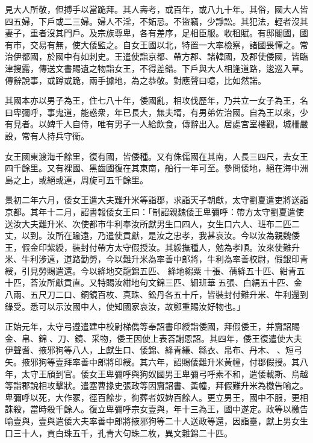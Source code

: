 \begin{pinyinscope}
 
 見大人所敬，但搏手以當跪拜。其人壽考，或百年，或八九十年。其俗，國大人皆四五婦，下戶或二三婦。婦人不淫，不妬忌。不盜竊，少諍訟。其犯法，輕者沒其妻子，重者沒其門戶。及宗族尊卑，各有差序，足相臣服。收租賦。有邸閣國，國有市，交易有無，使大倭監之。自女王國以北，特置一大率檢察，諸國畏憚之。常治伊都國，於國中有如刺史。王遣使詣京都、帶方郡、諸韓國，及郡使倭國，皆臨津搜露，傳送文書賜遺之物詣女王，不得差錯。下戶與大人相逢道路，逡巡入草。傳辭說事，或蹲或跪，兩手據地，為之恭敬。對應聲曰噫，比如然諾。
 
 
 
 
 其國本亦以男子為王，住七八十年，倭國亂，相攻伐歷年，乃共立一女子為王，名曰卑彌呼，事鬼道，能惑衆，年已長大，無夫壻，有男弟佐治國。自為王以來，少有見者。以婢千人自侍，唯有男子一人給飲食，傳辭出入。居處宮室樓觀，城柵嚴設，常有人持兵守衞。
 
 
 
 
 女王國東渡海千餘里，復有國，皆倭種。又有侏儒國在其南，人長三四尺，去女王四千餘里。又有裸國、黑齒國復在其東南，船行一年可至。參問倭地，絕在海中洲島之上，或絕或連，周旋可五千餘里。
 
 
景初二年六月，倭女王遣大夫難升米等詣郡，求詣天子朝獻，太守劉夏遣吏將送詣京都。其年十二月，詔書報倭女王曰：「制詔親魏倭王卑彌呼：帶方太守劉夏遣使送汝大夫難升米、次使都巿牛利奉汝所獻男生口四人，女生口六人、班布二匹二丈，以到。汝所在踰遠，乃遣使貢獻，是汝之忠孝，我甚哀汝。今以汝為親魏倭王，假金印紫綬，裝封付帶方太守假授汝。其綏撫種人，勉為孝順。汝來使難升米、牛利涉遠，道路勤勞，今以難升米為率善中郎將，牛利為率善校尉，假銀印青綬，引見勞賜遣還。今以絳地交龍錦五匹、
 絳地縐粟𦋺十張、蒨絳五十匹、紺青五十匹，荅汝所獻貢直。又特賜汝紺地句文錦三匹、細班華𦋺五張、白絹五十匹、金八兩、五尺刀二口、銅鏡百枚、真珠、鈆丹各五十斤，皆裝封付難升米、牛利還到錄受。悉可以示汝國中人，使知國家哀汝，故鄭重賜汝好物也。」
 
 
 
 
 正始元年，太守弓遵遣建中校尉梯儁等奉詔書印綬詣倭國，拜假倭王，并齎詔賜金、帛、錦𦋺、刀、鏡、采物，倭王因使上表荅謝恩詔。其四年，倭王復遣使大夫伊聲耆、掖邪狗等八人，上獻生口、倭錦、絳青縑、緜衣、帛布、丹木、򠐂、短弓矢。掖邪狗等壹拜率善中郎將印綬。其六年，詔賜倭難升米黃幢，付郡假授。其八年，太守王頎到官。倭女王卑彌呼與狗奴國男王卑彌弓呼素不和，遣倭載斯、烏越等詣郡說相攻擊狀。遣塞曹掾史張政等因齎詔書、黃幢，拜假難升米為檄告喻之。卑彌呼以死，大作冢，徑百餘步，徇葬者奴婢百餘人。更立男王，國中不服，更相誅殺，當時殺千餘人。復立卑彌呼宗女壹與，年十三為王，國中遂定。政等以檄告喻壹與，壹與遣倭大夫率善中郎將掖邪狗等二十人送政等還，因詣臺，獻上男女生口三十人，貢白珠五千，孔青大句珠二枚，異文雜錦二十匹。
 

\end{pinyinscope}
